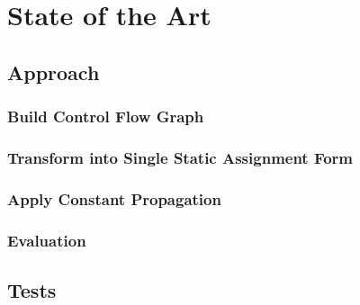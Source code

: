\chapter{State of the Art}
\label{cha:state of the art}

\section{Approach}
\subsection{Build Control Flow Graph}
\subsection{Transform into Single Static Assignment Form}
\subsection{Apply Constant Propagation}
\subsection{Evaluation}
\section{Tests}
